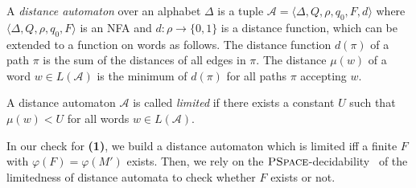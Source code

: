 \documentclass[envcountsame]{llncs}
\newcommand{\PSPACE}{\complexityclass{PSpace}}
\newcommand{\complexityclass}[1]{\ensuremath{\textsc{#1}}\xspace}
\newcommand{\cA}{\ensuremath{\mathcal{A}}\xspace}
\begin{document}
\begin{definition}
  \label{def:distance-automaton}
  A \emph{distance automaton} over an alphabet $\Delta$ is a tuple
  $\cA = \langle \Delta, Q, \rho, q_0, F, d\rangle$ where $\langle
  \Delta, Q, \rho, q_0, F\rangle$ is an NFA and $d : \rho
  \rightarrow \{0 , 1\}$ is a distance function, which can be extended
  to a function on words as follows.
The distance function $d(\pi)$ of a path $\pi$ is the sum of the
  distances of all edges in $\pi$.
The distance $\mu(w)$ of a word $w \in L(\cA)$ is the minimum of
  $d(\pi)$ for all paths $\pi$ accepting $w$.

  A distance automaton $\cA$ is called \emph{limited} if there exists
  a constant $U$ such that $\mu(w) < U$ for all words $w \in L(\cA)$.
\end{definition}

In our check for {\bfseries(1)}, we build a distance automaton which
is limited iff a finite $F$ with $\varphi(F)=\varphi(M')$ exists.
Then, we rely on the
\PSPACE-decidability~\cite{leung04:_limit_probl_distan_autom} of the
limitedness of distance automata to check whether $F$ exists or not.
\end{document}
